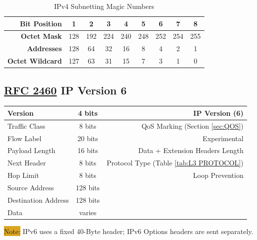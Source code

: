 \documentclass[12pt]{article}
\newcommand{\note}[1]{\colorbox{#1}{Note:}}
\newcommand{\RFC}[1]{\href{https://datatracker.ietf.org/doc/html/rfc#1}{RFC #1}}
\begin{document}
	\begin{table}[H]
	\centering
	\caption{IPv4 Subnetting Magic Numbers \label{tab:SUBNETTING}}
	\begin{tabular}{r | cccccccc}
	\hline
	\textbf{Bit Position}	& 1	& 2	& 3	& 4	& 5	& 6	& 7 & 8\\\hline
	\textbf{Octet Mask}	& 128 & 192 & 224 & 240 & 248 & 252 & 254 & 255\\\hline
	\textbf{Addresses}	& 128	& 64	& 32	& 16	& 8	& 4	& 2	& 1\\\hline
	\textbf{Octet Wildcard}	& 127	& 63	& 31 	& 15	& 7	& 3	& 1	& 0\\\hline
	\end{tabular}\end{table}


	\subsection[RFC 2460 IPv6]{\RFC{2460} IP Version 6 \label{subsec:IPV6}}
	\begin{table}[H]
	\centering
	\begin{tabular}{| l | c | r |}
	\hline
	Version			& 4 bits	& IP Version (6)\\\hline
	Traffic Class			& 8 bits	& QoS Marking (Section \ref{sec:QOS})\\\hline
	Flow Label			& 20 bits	& Experimental\\\hline
	Payload Length		& 16 bits	& Data + Extension Headers Length\\\hline
	Next Header		& 8 bits	& Protocol Type (Table \ref{tab:L3 PROTOCOL})\\\hline
	Hop Limit			& 8 bits	& Loop Prevention\\\hline
	Source Address		& 128 bits	&\\\hline
	Destination Address	& 128 bits	&\\\hline
	Data				& varies	&\\\hline
	\end{tabular}\end{table}
	\note{Goldenrod} IPv6 uses a fixed 40-Byte header; IPv6 Options headers are sent separately.
\end{document}
